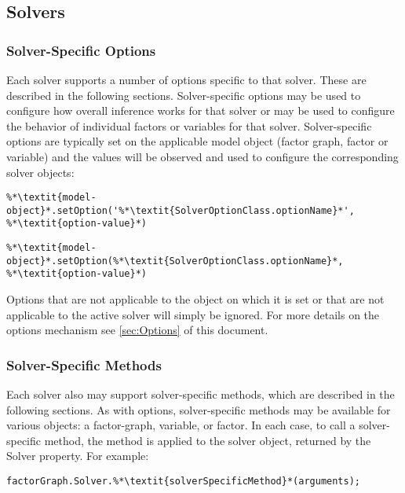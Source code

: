 \subsection{Solvers}
\label{sec:SolversAPI}


\subsubsection{Solver-Specific Options}

Each solver supports a number of options specific to that solver. These are described in the following sections. Solver-specific options may be used to configure how overall inference works for that solver or may be used to configure the behavior of individual factors or variables for that solver. Solver-specific options are typically set on the applicable model object (factor graph, factor or variable) and the values will be observed and used to configure the corresponding solver objects:

\ifmatlab
\begin{lstlisting}
%*\textit{model-object}*.setOption('%*\textit{SolverOptionClass.optionName}*', %*\textit{option-value}*)
\end{lstlisting}
\fi
\ifjava
\begin{lstlisting}
%*\textit{model-object}*.setOption(%*\textit{SolverOptionClass.optionName}*, %*\textit{option-value}*)
\end{lstlisting}
\fi

Options that are not applicable to the object on which it is set or that are not applicable to the active solver will simply be ignored. For more details on the options mechanism see \autoref{sec:Options} of this document.

\subsubsection{Solver-Specific Methods}

Each solver also may support solver-specific methods, which are described in the following sections. As with options, solver-specific methods may be available for various objects: a factor-graph, variable, or factor. In each case, to call a solver-specific method, the method is applied to the solver object, returned by the Solver property.  For example:

\ifmatlab
\begin{lstlisting}
factorGraph.Solver.%*\textit{solverSpecificMethod}*(arguments);
\end{lstlisting}

